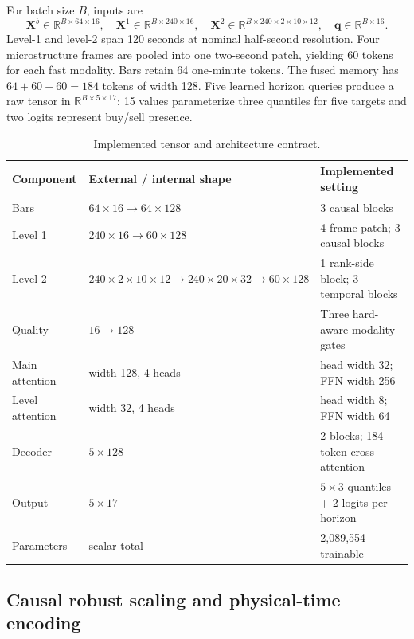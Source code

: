 \documentclass[10pt,letterpaper]{article}
\numberwithin{equation}{section}
\newcommand{\R}{\mathbb{R}}
\theoremstyle{definition}
\theoremstyle{remark}
\begin{document}
For batch size \(B\), inputs are
\begin{equation}
\mathbf{X}^{b}\in\R^{B\times64\times16},\quad
\mathbf{X}^{1}\in\R^{B\times240\times16},\quad
\mathbf{X}^{2}\in\R^{B\times240\times2\times10\times12},\quad
\mathbf{q}\in\R^{B\times16}.
\label{eq:inputs}
\end{equation}
Level-1 and level-2 span 120 seconds at nominal half-second resolution. Four
microstructure frames are pooled into one two-second patch, yielding 60 tokens
for each fast modality. Bars retain 64 one-minute tokens. The fused memory has
\(64+60+60=184\) tokens of width 128. Five learned horizon queries produce a
raw tensor in \(\R^{B\times5\times17}\): 15 values parameterize three
quantiles for five targets and two logits represent buy/sell presence.

\begin{table}[!htbp]
\centering
\small
\begin{tabularx}{\textwidth}{@{}Y Y Y@{}}
\toprule
\textbf{Component} & \textbf{External / internal shape} &
\textbf{Implemented setting}\\
\midrule
Bars & \(64\times16\rightarrow64\times128\) & 3 causal blocks\\
Level 1 & \(240\times16\rightarrow60\times128\) &
4-frame patch; 3 causal blocks\\
Level 2 & \(240\times2\times10\times12
\rightarrow240\times20\times32\rightarrow60\times128\) &
1 rank-side block; 3 temporal blocks\\
Quality & \(16\rightarrow128\) & Three hard-aware modality gates\\
Main attention & width 128, 4 heads & head width 32; FFN width 256\\
Level attention & width 32, 4 heads & head width 8; FFN width 64\\
Decoder & \(5\times128\) & 2 blocks; 184-token cross-attention\\
Output & \(5\times17\) & \(5\times3\) quantiles + 2 logits per horizon\\
Parameters & scalar total & 2,089,554 trainable\\
\bottomrule
\end{tabularx}
\caption{Implemented tensor and architecture contract.}
\label{tab:architecture}
\end{table}

\subsection{Causal robust scaling and physical-time encoding}
\end{document}
